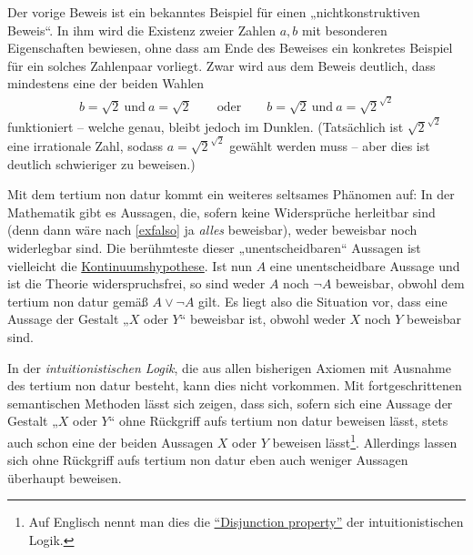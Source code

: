    
\begin{vorschau} \label{nichtkonstruktiv} 
    Der vorige Beweis ist ein bekanntes Beispiel für einen „nichtkonstruktiven Beweis“. In ihm wird die Existenz zweier Zahlen $a,b$ mit besonderen Eigenschaften bewiesen, ohne dass am Ende des Beweises ein konkretes Beispiel für ein solches Zahlenpaar vorliegt. Zwar wird aus dem Beweis deutlich, dass mindestens eine der beiden Wahlen
    \begin{align*}
        b=\sqrt{2}\ \text{und}\ a=\sqrt{2} \qquad \text{oder}\qquad  b=\sqrt{2}\ \text{und}\ a=\sqrt{2}^{\sqrt{2}}
    \end{align*}
    funktioniert -- welche genau, bleibt jedoch im Dunklen. (Tatsächlich ist $\sqrt{2}^{\sqrt{2}}$ eine irrationale Zahl, sodass $a=\sqrt{2}^{\sqrt{2}}$ gewählt werden muss -- aber dies ist deutlich schwieriger zu beweisen.)
    
    Mit dem tertium non datur kommt ein weiteres seltsames Phänomen auf: In der Mathematik gibt es Aussagen, die, sofern keine Widersprüche herleitbar sind (denn dann wäre nach \cref{exfalso} ja \emph{alles} beweisbar), weder beweisbar noch widerlegbar sind. Die berühmteste dieser „unentscheidbaren“ Aussagen ist vielleicht die \href{https://de.wikipedia.org/wiki/Kontinuumshypothese}{Kontinuumshypothese}. Ist nun $A$ eine unentscheidbare Aussage und ist die Theorie widerspruchsfrei, so sind weder $A$ noch $\neg A$ beweisbar, obwohl dem tertium non datur gemäß $A\lor \neg A$ gilt. Es liegt also die Situation vor, dass eine Aussage der Gestalt „$X$ oder $Y$“ beweisbar ist, obwohl weder $X$ noch $Y$ beweisbar sind.
    
    In der \emph{intuitionistischen Logik}, die aus allen bisherigen Axiomen mit Ausnahme des tertium non datur besteht, kann dies nicht vorkommen. Mit fortgeschrittenen semantischen Methoden lässt sich zeigen, dass sich, sofern sich eine Aussage der Gestalt „$X$ oder $Y$“ ohne Rückgriff aufs tertium non datur beweisen lässt, stets auch schon eine der beiden Aussagen $X$ oder $Y$ beweisen lässt\footnote{Auf Englisch nennt man dies die \href{https://en.wikipedia.org/wiki/Disjunction_and_existence_properties}{``Disjunction property''} der intuitionistischen Logik.}. Allerdings lassen sich ohne Rückgriff aufs tertium non datur eben auch weniger Aussagen überhaupt beweisen.
\end{vorschau}


